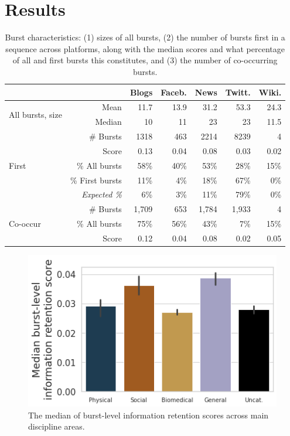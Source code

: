 \documentclass[letterpaper]{article} %
\begin{document}
\section{Results}

\begin{table}[t]
    \centering
    \begin{tabular}{@{}l |r | r r r r r @{}}
    & & Blogs & Faceb. & News & Twitt. & Wiki. \\
    \hline
    \multirow{2}{7em}{All bursts, size} & Mean & 11.7 & 13.9 & 31.2 & 53.3 & 24.3 \\
    & Median & 10 & 11 & 23 & 23 & 11.5 \\
    \hline
    \hline
    \multirow{5}{7em}{First} & \# Bursts & 1318 & 463 & 2214 & 8239 & 4\\
    \cline{2-7}
    & Score & 0.13 & 0.04 & 0.08 & 0.03 & 0.02 \\
    \cline{2-7}
    & \% All bursts & 58\% & 40\% & 53\% & 28\% & 15\% \\
    \cline{2-7}
    & \% First bursts & 11\% & 4\% & 18\% & 67\% & 0\% \\
    & \textit{Expected \%} & 6\% & 3\% & 11\% & 79\% & 0\% \\
    \hline
    \hline
    \multirow{3}{7em}{Co-occur} & \# Bursts & 1,709 & 653 & 1,784 & 1,933 & 4\\
    & \% All bursts & 75\% & 56\% & 43\% & 7\% & 15\% \\
    \cline{2-7}
    & Score & 0.12 & 0.04 & 0.08 & 0.02 & 0.05 \\
    \end{tabular}
    \caption{Burst characteristics: (1) sizes of all bursts, (2) the number of bursts first in a sequence across platforms, along with the median scores and what percentage of all and first bursts this constitutes, and (3) the number of co-occurring bursts.}
    \label{tab:first_co_occurring}
\end{table}

\begin{figure}
    \centering
    \includegraphics[width=0.7\columnwidth]{figs/fig_domains.png}
    \caption{The median of burst-level information retention scores across main discipline areas.}
    \label{fig:burst_domains}
\end{figure}
\end{document}
